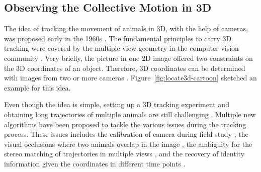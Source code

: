 \documentclass[11pt,twoside]{report}
\begin{document}
\subsection{Observing the Collective Motion in 3D}

The idea of tracking the movement of animals in 3D, with the help of cameras, was proposed early in the 1960s \cite{cullen1965, pitcher1973}.
The fundamental principles to carry 3D tracking were covered by the multiple view geometry in the computer vision community \cite{hartley2003}. Very briefly, the picture in one 2D image offered two constraints on the 3D coordinates of an object. Therefore, 3D coordinates can be determined with images from two or more cameras \cite{cavagna2008ab}. Figure~\ref{fig:locate3d-cartoon} sketched an example for this idea.



Even though the idea is simple, setting up a 3D tracking experiment and obtaining long trajectories of multiple animals are still challenging \cite{pedersen2020}.
Multiple new algorithms have been proposed to tackle the various issues during the tracking process. These issues includes the calibration of camera during field study \cite{cavagna2008ab, ling2018}, the visual occlusions where two animals overlap in the image \cite{cavagna2021ieee}, the ambiguity for the stereo matching of trajectories in multiple views \cite{attanasi2015b}, and the recovery of identity information given the coordinates in different time points \cite{ouellette2005ef, xu2008}.
\end{document}
